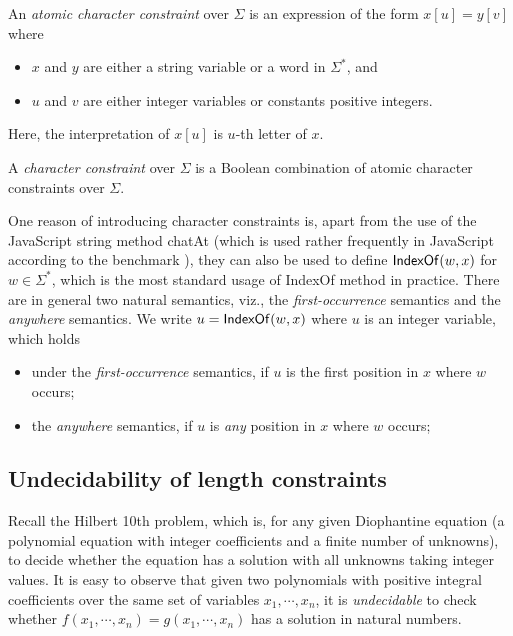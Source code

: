\begin{definition}
	An \emph{atomic character constraint} over $\Sigma$ is an expression of the form $x[u]=y[v]$ where 
	\begin{itemize}
		\item $x$ and $y$ are either a string variable or a word in $\Sigma^*$, and 
		\item $u$ and $v$ are either integer variables or constants positive integers.
	\end{itemize} 
Here, the interpretation of $x[u]$ is $u$-th letter of $x$.	
	
A \emph{character constraint} over $\Sigma$ is a Boolean combination of atomic character constraints over $\Sigma$. 
\end{definition}

One reason of introducing character constraints is, apart from the use of the JavaScript string method chatAt (which is used rather frequently in JavaScript according to the benchmark \cite{}), they can also be used to define $\mathsf{IndexOf}(w,x)$ for $w\in \Sigma^*$, which is the most standard usage of IndexOf method in practice. There are in general two natural semantics, viz., the \emph{first-occurrence} semantics and the \emph{anywhere} semantics. We write $u=\mathsf{IndexOf}(w,x)$ where $u$ is an integer variable, which holds
\begin{itemize}
	\item under  the \emph{first-occurrence} semantics, if $u$ is the first position in $x$ where $w$ occurs;
	
	\item the \emph{anywhere} semantics, if $u$ is \emph{any} position in $x$ where $w$ occurs;
\end{itemize}  
 


\subsection{Undecidability of length constraints}

Recall the Hilbert 10th problem, which is, for any given Diophantine equation (a polynomial equation with integer coefficients and a finite number of unknowns), to decide whether the equation has a solution with all unknowns taking integer values. It is easy to observe that given two polynomials with positive integral coefficients over the same set of variables $x_1, \cdots, x_n$, it is \emph{undecidable} to check whether $f(x_1, \cdots, x_n)=g(x_1, \cdots, x_n)$ has a solution in natural numbers. 

